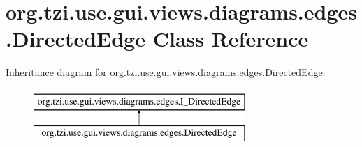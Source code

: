 \hypertarget{classorg_1_1tzi_1_1use_1_1gui_1_1views_1_1diagrams_1_1edges_1_1_directed_edge}{\section{org.\-tzi.\-use.\-gui.\-views.\-diagrams.\-edges.\-Directed\-Edge Class Reference}
\label{classorg_1_1tzi_1_1use_1_1gui_1_1views_1_1diagrams_1_1edges_1_1_directed_edge}
}
Inheritance diagram for org.\-tzi.\-use.\-gui.\-views.\-diagrams.\-edges.\-Directed\-Edge\-:\begin{figure}[H]
\begin{center}
\leavevmode
\includegraphics[height=2.000000cm]{classorg_1_1tzi_1_1use_1_1gui_1_1views_1_1diagrams_1_1edges_1_1_directed_edge}
\end{center}
\end{figure}
